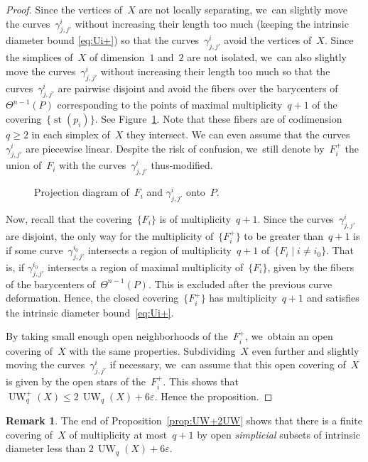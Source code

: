 \documentclass[JEP,XML,SOM,Unicode,NoFloatCountersInSection,published]{cedram}
\theoremstyle{definition}
\newtheorem{remark}[theorem]{Remark}
\DeclareMathOperator{\st}{st}
\DeclareMathOperator{\UW}{UW}
\begin{document}
\begin{proof}
Since the vertices of~$X$ are not locally separating, we~can slightly move the curves~$\gamma^i_{j,j'}$ without increasing their length too much (keeping the intrinsic diameter bound \eqref{eq:Ui+}) so that the curves~$\gamma^i_{j,j'}$ avoid the vertices of~$X$. Since the simplices of~$X$ of dimension~$1$ and~$2$ are not isolated, we~can also slightly move the curves~$\gamma^i_{j,j'}$ without increasing their length too much so that the curves~$\gamma^i_{j,j'}$ are pairwise disjoint and avoid the fibers over the barycenters of~$\Theta^{n-1}(P)$ corresponding to the points of maximal multiplicity~$q+1$ of the covering~$\{\st(p_i)\}$.
See Figure~\ref{fig:projection}.
Note that these fibers are of codimension~$q \geq 2$ in each simplex of~$X$ they intersect.
We can even assume that the curves~$\gamma^i_{j,j'}$ are piecewise linear.
Despite the risk of confusion, we~still denote by~$F_i^+$ the union of~$F_i$ with the curves~$\gamma^i_{j,j'}$ thus-modified.

\begin{figure}[htbp!]
\vspace{-1cm}
\hspace{0cm}
\def\svgwidth{7cm}

\caption{Projection diagram of~$F_i$ and $\gamma^i_{j,j'}$ onto~$P$.} \label{fig:projection}
\end{figure}

Now, recall that the covering~$\{F_i\}$ is of multiplicity~$q+1$.
Since the curves~$\gamma^i_{j,j'}$ are disjoint, the only way for the multiplicity of~$\{F_i^+\}$ to be greater than~$q+1$ is if some curve~$\gamma^{i_0}_{j,j'}$ intersects a region of multiplicity~$q+1$ of~$\{F_i \mid i \neq i_0\}$.
That is, if $\gamma^{i_0}_{j,j'}$ intersects a region of maximal multiplicity of~$\{F_i\}$, given by the fibers of the barycenters of~$\Theta^{n-1}(P)$.
This is excluded after the previous curve deformation.
Hence, the closed covering~$\{F_i^+\}$ has multiplicity~$q+1$ and satisfies the intrinsic diameter bound~\eqref{eq:Ui+}.

By taking small enough open neighborhoods of the~$F_i^+$, we~obtain an open covering of~$X$ with the same properties.
Subdividing~$X$ even further and slightly moving the curves~$\gamma^i_{j,j'}$ if necessary, we~can assume that this open covering of~$X$ is given by the open stars of the~$F_i^+$.
This shows that $\UW^+_q(X) \leq 2 \, \UW_q(X) + 6 \varepsilon$.
Hence the proposition.
\end{proof}

\begin{remark} \label{rem:UW+2UW}
The end of Proposition~\ref{prop:UW+2UW} shows that there is a finite covering of~$X$ of multiplicity at most~$q+1$ by open \emph{simplicial} subsets of intrinsic diameter less than $2 \, \UW_q(X) + 6 \varepsilon$.
\end{remark}
\end{document}
